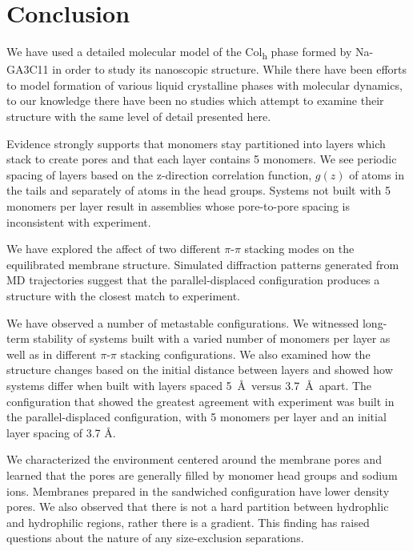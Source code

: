 \documentclass[journal=jpcbfk,manusciprt=article]{achemso}
\begin{document}
  \section{Conclusion}
  
  We have used a detailed molecular model of the Col\textsubscript{h} phase
  formed by Na-GA3C11 in order to study its nanoscopic structure. While there
  have been efforts to model formation of various liquid crystalline phases with
  molecular dynamics, to our knowledge there have been no studies which attempt
  to examine their structure with the same level of detail presented here.

  Evidence strongly supports that monomers stay partitioned into layers which
  stack to create pores and that each layer contains 5 monomers. We see periodic
  spacing of layers based on the z-direction correlation function, $g(z)$ of
  atoms in the tails and separately of atoms in the head groups.  Systems not
  built with 5 monomers per layer result in assemblies whose pore-to-pore spacing
  is inconsistent with experiment. 

  We have explored the affect of two different $\pi$-$\pi$ stacking modes on
  the equilibrated membrane structure. Simulated diffraction patterns generated
  from MD trajectories suggest that the parallel-displaced configuration produces
  a structure with the closest match to experiment.

  We have observed a number of metastable configurations. We witnessed
  long-term stability of systems built with a varied number of monomers per layer
  as well as in different $\pi$-$\pi$ stacking configurations. We also examined
  how the structure changes based on the initial distance between layers and
  showed how systems differ when built with layers spaced 5~\AA~versus
  3.7~\AA~apart. The configuration that showed the greatest agreement with
  experiment was built in the parallel-displaced configuration, with 5 monomers
  per layer and an initial layer spacing of 3.7 \AA.  

  We characterized the environment centered around the membrane pores and
  learned that the pores are generally filled by monomer head groups and sodium
  ions. Membranes prepared in the sandwiched configuration have lower density 
  pores. We also observed that there is not a hard partition between hydrophlic
  and hydrophilic regions, rather there is a gradient.  This finding has raised
  questions about the nature of any size-exclusion separations.  
\end{document}
